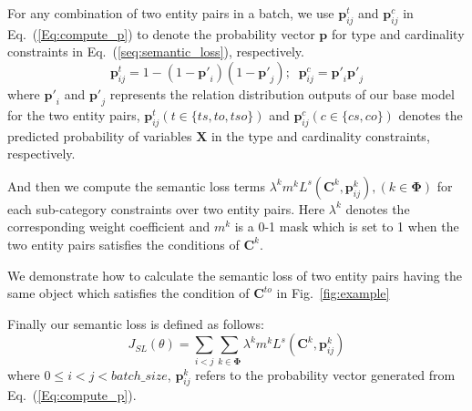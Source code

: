 
For any combination of two entity pairs in a batch, we use $\bm{p}_{ij}^{t}$ and $\bm{p}_{ij}^{c}$ in Eq.~(\ref{Eq:compute_p}) to denote the probability vector $\bm{p}$ for type and cardinality constraints in Eq.~(\ref{seq:semantic_loss}), respectively.
\begin{equation}
\label{Eq:compute_p}
\bm{p}_{ij}^{t} = 1-(1-\bm{p'}_{i})(1-\bm{p'}_{j});\;\; \bm{p}_{ij}^{c} = \bm{p'}_{i}\bm{p'}_{j}
\end{equation}
where $\bm{p'}_i$ and $\bm{p'}_j$ represents the relation distribution outputs of our base model for the two entity pairs,
$\bm{p}_{ij}^{t}(t \in \{ts, to, tso\})$ and $\bm{p}_{ij}^{c}(c \in \{cs, co\})$ denotes the predicted probability of variables $\bm{X}$ in the type and cardinality constraints, respectively.

And then we compute the semantic loss terms $\lambda ^{k}m^{k}L^{s}(\bm{C}^{k}, \bm{p}_{ij}^{k}), (k \in \bm{\Phi})$ for each sub-category constraints over two entity pairs.
Here $\lambda^{k}$ denotes the corresponding weight coefficient and $m^{k}$ is a 0-1 mask which is set to 1 when the two entity pairs satisfies the conditions of $\bm{C}^{k}$.

We demonstrate how to calculate the semantic loss of two entity pairs having the same object which satisfies the condition of $\bm{C}^{to}$ in Fig.~\ref{fig:example}



Finally our semantic loss is defined as follows:
\begin{equation}
	J_{SL}(\theta) = \sum\limits_{i < j}{\sum_{k\in \bm{\Phi}}{\lambda ^{k}m^{k}L^{s}(\bm{C}^{k}, \bm{p}_{ij}^{k})}}
\end{equation}
where $0\leq i < j < batch\_size$,
$\bm{p}_{ij}^{k} $ refers to the probability vector generated from Eq.~(\ref{Eq:compute_p}).

